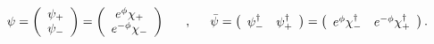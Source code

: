 \begin{equation}
\psi=\left( \begin{array}{c}
\psi_+          \\ \psi_-
\end{array}\right)=\left( \begin{array}{c}
e^\phi \chi_+          \\ e^{-\phi}\chi_-
\end{array}\right)\makebox[.5in]{,} \bar{\psi}=\left( \begin{array}{cc}
\psi_-^{\dagger} & \psi_+^{\dagger} \end{array}\right)=\left( \begin{array}{cc}
e^{\phi}\chi_-^{\dagger} & e^{-\phi}\chi_+^{\dagger} \end{array}\right).
\end{equation}

